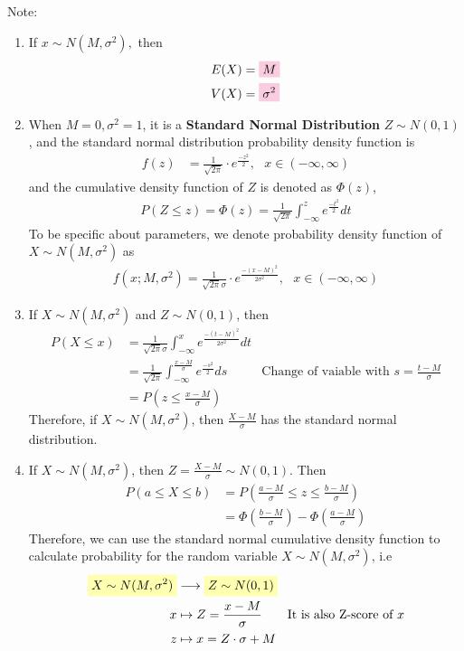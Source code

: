 \documentclass[11pt,oneside]{book}
\theoremstyle{newStyle}
\newcommand{\note}{\color{red}Note: \color{black}}
\begin{document}
\note \begin{enumerate}
\item If $x\sim N(M,\sigma^2),$ then \begin{align*}
E(X)&=\text{\colorbox{pink}{$M$}}\\
V(X)&=\text{\colorbox{pink}{$\sigma^2$}}
\end{align*}
\item When $M=0,\sigma^2=1$, it is a \textbf{Standard Normal Distribution} $Z\sim N(0,1)$, and the standard normal distribution probability density function is \begin{align*}
f(z)&=\frac{1}{\sqrt{2\pi}}\cdot e^{\frac{-z^2}{2}}, \text{ }x\in (-\infty, \infty)
\end{align*}
and the cumulative density function of $Z$ is denoted as $\Phi(z)$, \begin{align*}
P(Z\leq z)=\Phi(z)=\frac{1}{\sqrt{2\pi}}\int_{-\infty}^{z} e^{\frac{-t^2}{2}}dt
\end{align*}
To be specific about parameters, we denote probability density function of $X\sim N(M,\sigma^2)$ as \begin{align*}
f(x;M,\sigma^2)=\frac{1}{\sqrt{2\pi}\sigma}\cdot e^{\frac{-(x-M)^2}{2\sigma^2}}, \text{ }x\in (-\infty, \infty)
\end{align*}
\item If $X\sim N(M,\sigma^2)$ and $Z\sim N(0,1)$, then \begin{align*}
P(X\leq x)&=\frac{1}{\sqrt{2\pi}\sigma}\int_{-\infty}^{x} e^{\frac{-(t-M)^2}{2\sigma^2}}dt\\
&=\frac{1}{\sqrt{2\pi}}\int_{-\infty}^{\frac{x-M}{\sigma}} e^{\frac{-s^2}{2}}ds &\text{Change of vaiable with }s=\frac{t-M}{\sigma}\\
&=P(z\leq \frac{x-M}{\sigma})
\end{align*}
Therefore, if $X\sim N(M,\sigma^2)$, then $\frac{X-M}{\sigma}$ has the standard normal distribution.
\item If $X\sim N(M,\sigma^2)$, then $Z=\frac{X-M}{\sigma}\sim N(0,1)$. Then \begin{align*}
P(a\leq X\leq b)&=P\left(\frac{a-M}{\sigma}\leq z\leq \frac{b-M}{\sigma} \right)\\
&=\Phi \left(\frac{b-M}{\sigma} \right)-\Phi\left(\frac{a-M}{\sigma} \right)
\end{align*}
Therefore, we can use the standard normal cumulative density function to calculate probability for the random variable $X\sim N(M,\sigma^2)$, i.e \begin{align*}
\text{\colorbox{yellow}{$X\sim N(M,\sigma^2)$}}&\longrightarrow \text{\colorbox{yellow}{$Z\sim N(0,1)$}}\\
x&\mapsto Z=\frac{x-M}{\sigma}\text{\qquad It is also Z-score of }x \\
z&\mapsto x=Z\cdot \sigma+M 
\end{align*}
\end{enumerate}
\end{document}
